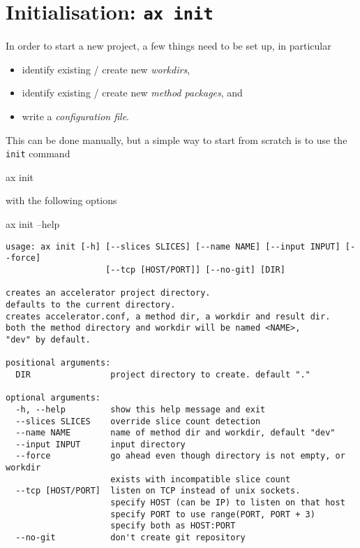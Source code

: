\section{Initialisation: \texttt{ax init}}
\label{sec:initialisation}
In order to start a new project, a few things need to be set up, in
particular
\begin{itemize}
\item[] identify existing / create new \textsl{workdirs},
\item[] identify existing / create new \textsl{method packages}, and
\item[] write a \textsl{configuration file}.
\end{itemize}
This can be done manually, but a simple way to start from scratch is
to use the \texttt{init} command
\begin{shell}
ax init
\end{shell}
with the following options
\begin{shell}
ax init --help
\end{shell}
\begin{snugshade}
\begin{verbatim}
usage: ax init [-h] [--slices SLICES] [--name NAME] [--input INPUT] [--force]
                    [--tcp [HOST/PORT]] [--no-git] [DIR]

creates an accelerator project directory.
defaults to the current directory.
creates accelerator.conf, a method dir, a workdir and result dir.
both the method directory and workdir will be named <NAME>,
"dev" by default.

positional arguments:
  DIR                project directory to create. default "."

optional arguments:
  -h, --help         show this help message and exit
  --slices SLICES    override slice count detection
  --name NAME        name of method dir and workdir, default "dev"
  --input INPUT      input directory
  --force            go ahead even though directory is not empty, or workdir
                     exists with incompatible slice count
  --tcp [HOST/PORT]  listen on TCP instead of unix sockets.
                     specify HOST (can be IP) to listen on that host
                     specify PORT to use range(PORT, PORT + 3)
                     specify both as HOST:PORT
  --no-git           don't create git repository
\end{verbatim}
\end{snugshade}



